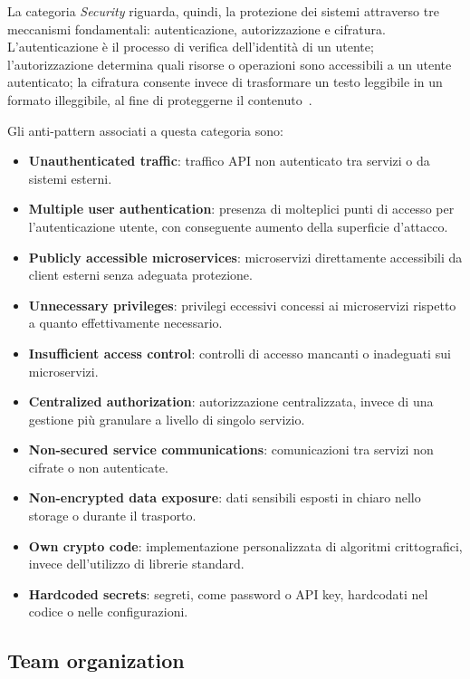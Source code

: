 La categoria \textit{Security} riguarda, quindi, la protezione dei sistemi attraverso tre meccanismi fondamentali: autenticazione, autorizzazione e cifratura. L’autenticazione è il processo di verifica dell’identità di un utente; l’autorizzazione determina quali risorse o operazioni sono accessibili a un utente autenticato; la cifratura consente invece di trasformare un testo leggibile in un formato illeggibile, al fine di proteggerne il contenuto~\cite{CernyCatalogo}.

Gli anti-pattern associati a questa categoria sono:
\begin{itemize}
  \item \textbf{Unauthenticated traffic}: traffico API non autenticato tra servizi o da sistemi esterni.
  \item \textbf{Multiple user authentication}: presenza di molteplici punti di accesso per l’autenticazione utente, con conseguente aumento della superficie d’attacco.
  \item \textbf{Publicly accessible microservices}: microservizi direttamente accessibili da client esterni senza adeguata protezione.
  \item \textbf{Unnecessary privileges}: privilegi eccessivi concessi ai microservizi rispetto a quanto effettivamente necessario.
  \item \textbf{Insufficient access control}: controlli di accesso mancanti o inadeguati sui microservizi.
  \item \textbf{Centralized authorization}: autorizzazione centralizzata, invece di una gestione più granulare a livello di singolo servizio.
  \item \textbf{Non-secured service communications}: comunicazioni tra servizi non cifrate o non autenticate.
  \item \textbf{Non-encrypted data exposure}: dati sensibili esposti in chiaro nello storage o durante il trasporto.
  \item \textbf{Own crypto code}: implementazione personalizzata di algoritmi crittografici, invece dell’utilizzo di librerie standard.
  \item \textbf{Hardcoded secrets}: segreti, come password o API key, hardcodati nel codice o nelle configurazioni.
\end{itemize}

\subsection{Team organization}

